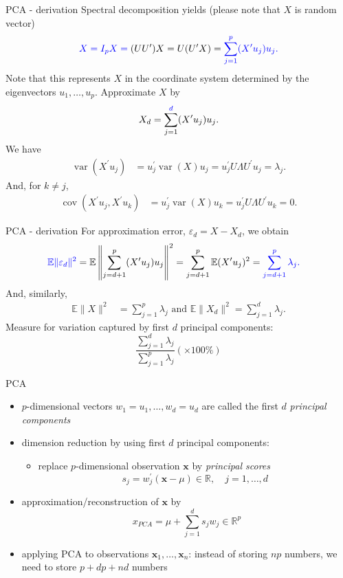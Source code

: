 \documentclass[pdf, handout]{beamer}
\begin{document}
\begin{frame}{PCA - derivation}
Spectral decomposition yields (please note that $X$ is random vector)
\[
\color{blue} X = I_p X = \color{black}(U U^\prime) X=U (U^\prime X) =  \color{blue}  \sum_{j=1}^p  (X^\prime u_j)  u_j.
\]
Note that this represents $X$ in the coordinate system determined by the eigenvectors $u_1,\dots,u_p$. Approximate $X$ by
\[
X_{d} = \sum_{j=1}^{\color{blue} d \color{black}}  (X^\prime u_j)  u_j.
\]
We have
\begin{align*}
\operatorname{var}   (X^\prime u_j)  
&=  u_j^\prime \operatorname{var}(X)  u_j = u_j^\prime U\Lambda U^\prime u_j 
= \lambda_j.  
\end{align*}
And, for $k\neq j$,
\begin{align*}
\operatorname{cov}\left( X^\prime u_j, X^\prime u_k\right)  
&=  u_j^\prime \operatorname{var}(X)  u_k = u_j^\prime U\Lambda U^\prime u_k 
= 0. 
\end{align*}
\end{frame}

\begin{frame}{PCA - derivation}
For approximation error, $\varepsilon_d=X-X_d$, we obtain
\begin{align*}
\color{blue}\mathbb{E}\|\varepsilon_d\|^2&=\color{black}
 \mathbb{E} \left\| \sum_{j=d+1}^p (X^\prime u_j)  u_j \right\|^2 = 
\sum_{j=d+1}^p \mathbb{E}   (X^\prime u_j)^2
=\color{blue} \sum_{j=d+1}^p \lambda_j.  
\end{align*}
And, similarly,
\begin{align*}
\mathbb{E} \| X \|^2    &=  \sum_{j=1}^p \lambda_j \text{ and }
\mathbb{E} \| X_{d} \|^2 =  \sum_{j=1}^d \lambda_j.
\end{align*}
Measure for variation captured by first $d$ principal components:
\[
\frac{\sum_{j=1}^d \lambda_j  }{  \sum_{j=1}^p \lambda_j } \left( \times 100 \% \right) 
\]
\end{frame}

\begin{frame}{PCA}
\begin{itemize}
\item $p$-dimensional vectors $w_1=u_1,\dots,w_d=u_d$ are called the first $d$ \emph{principal components}
\item dimension reduction by using first $d$ principal components:
\begin{itemize}
\item replace $p$-dimensional
observation $\mathbf{x}$ by \emph{principal scores} 
\[
s_j=w_j^\prime (\mathbf{x} - \mu)\in\mathbb{R}, \quad j=1,\dots,d 
\] 
\end{itemize}
\item approximation/reconstruction of $\mathbf{x}$ by
\[
x_{PCA} =\mu + \sum_{j=1}^d s_j w_j    \in \mathbb{R}^p
\]
\item applying PCA to observations $\mathbf{x}_1,\dots,\mathbf{x}_n$: instead of storing $np$ numbers, we need to store $p+dp + nd$ numbers
\end{itemize}
\end{frame}
\end{document}
